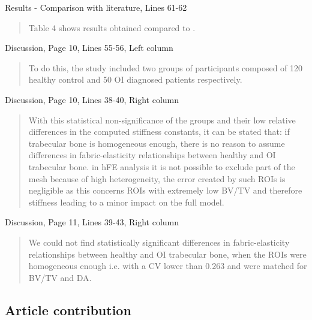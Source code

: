 \documentclass{AR2RC}
\begin{document}
Results - Comparison with literature, Lines 61-62
\begin{quote}
	Table 4 shows results obtained  compared to  .
\end{quote}

Discussion, Page 10, Lines 55-56, Left column
\begin{quote}
	To do this, the study included two groups of participants composed of 120 healthy control and 50 OI diagnosed patients respectively. 
\end{quote}

Discussion, Page 10, Lines 38-40, Right column
\begin{quote}
	With this statistical non-significance of the groups and their low relative differences in the computed stiffness constants, it can be stated that: if trabecular bone is homogeneous enough, there is no reason to assume differences in fabric-elasticity relationships between healthy and OI trabecular bone.  in hFE analysis  it is not possible to exclude part of the mesh because of high heterogeneity, the error created by such ROIs is negligible as this  concerns ROIs with extremely low BV/TV and therefore stiffness leading to a minor impact on the full model.
\end{quote}

Discussion, Page 11, Lines 39-43, Right column

\begin{quote}
	We could not find statistically significant differences in fabric-elasticity relationships between healthy and OI trabecular bone, when the ROIs were homogeneous enough i.e. with a CV lower than 0.263 and were matched for BV/TV and DA.
\end{quote}

\subsection{Article contribution}
\end{document}
